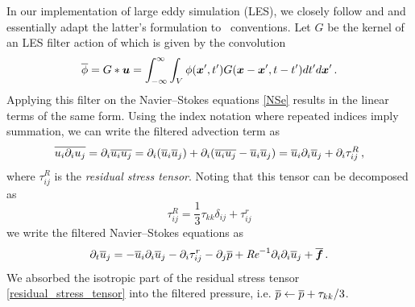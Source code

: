 \documentclass[a4paper, 11pt]{article}
\begin{document}
In our implementation of large eddy simulation (LES), we closely follow
\cite{pope2000turbulent} and \cite{vanVeen2018transitions} 
and essentially adapt the latter's formulation to \dnsbox\ conventions.
Let $G$ be the kernel of an LES filter action of which is given by the 
convolution
\begin{equation}
    \overline{\phi} = G \ast \bm{u} = 
    \int_{-\infty}^{\infty} \int_{V} \phi (\bm{x}', t') 
                                G(\bm{x} - \bm{x}', t - t') dt' d\bm{x}' 
    \,. \label{les_filter}
\end{equation} 
Applying this filter on the Navier--Stokes equations \cref{NSe} results 
in the linear terms of the same form. Using the index notation where repeated 
indices imply summation, we can write the filtered advection term as 
\begin{equation}
    \overline{u_i \partial_i u_j} 
      = \partial_i \overline{u_i u_j}
      = \partial_i (\overline{u}_i \overline{u}_j) + \partial_i (\overline{u_i u_j} - \overline{u}_i \overline{u}_j)
      = \overline{u}_i \partial_i \overline{u}_j + \partial_i \tau_{ij}^{R} \,,
\end{equation}
where $\tau_{ij}^{R}$ is the \emph{residual stress tensor}. Noting that this 
tensor can be decomposed as
\begin{equation}
    \tau_{ij}^{R} = \frac{1}{3} \tau_{kk} \delta_{ij} + \tau_{ij}^{r}
    \label{residual_stress_tensor}
\end{equation}
we write the filtered Navier--Stokes equations as 
\begin{equation}
	\partial_t \overline{u}_j = 
        -\overline{u}_i  \partial_i \overline{u}_j - \partial_i \tau_{ij}^r - \partial_j \overline{p} 
        + \textit{Re}^{-1} \partial_i \partial_i \overline{u}_j + \overline{\bm{f}} \, . 
        \label{filtered_NSe}
\end{equation}
We absorbed the isotropic part of the
residual stress tensor \cref{residual_stress_tensor} into the filtered
pressure, i.e. $\overline{p} \leftarrow \overline{p} + \tau_{kk} / 3 $. 
\end{document}
